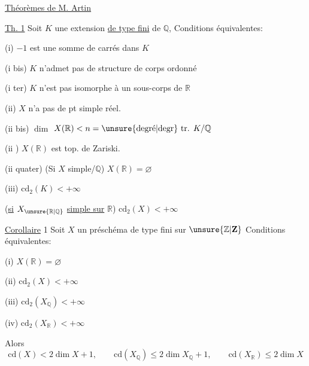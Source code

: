 \uline{Théorèmes de M. Artin}

\uline{Th. 1} Soit $K$ une extension \uline{de type fini} de $\mathbb Q$, Conditions
équivalentes:

(i) $-1$ est une somme de carrés dans $K$

(i bis) $K$ n'admet pas de structure de corps ordonné

(i ter) $K$ n'est pas isomorphe à un sous-corps de $\mathbb R$

(ii)  $X$  n'a pas de pt simple réel.


(ii bis) 
$\dim$
$X(\mathbb R)<n=\text{\unsure{degré|degr} tr. }K/\mathbb Q$

(ii ) $X(\mathbb R)$ est  top. de Zariski.

(ii quater) (Si $X$ simple/$\mathbb Q$) \quad $X(\mathbb R)=\varnothing$

(iii) $\mathrm{cd}_2(K)<+\infty$

(\uline{si} $X_{\unsure{\mathbb R|\mathbb Q}}$ \uline{simple sur} $\mathbb R$) \quad $\mathrm{cd}_2(X)<+\infty$

\uline{Corollaire} 1 Soit $X$ un préschéma de type fini sur $\unsure{\mathbb Z|\mathbf Z}$
 Conditions équivalentes:

(i) $X(\mathbb R)=\varnothing$

(ii) $\mathrm{cd}_2(X)<+\infty$


(iii) $\mathrm{cd}_2(X_{\mathbb Q})<+\infty$


(iv) $\mathrm{cd}_2(X_{\mathbb R})<+\infty$

Alors
\[
\mathrm{cd}(X)<2\dim X+1,\qquad
\mathrm{cd}(X_{\mathbb Q})\leq2\dim X_{\mathbb Q}+1,
\qquad\mathrm{cd}(X_{\mathbb R})\leq2\dim X
\]

